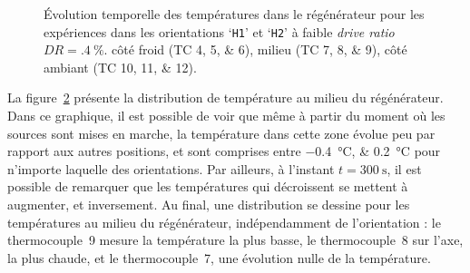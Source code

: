 \begin{figure}[!ht]
    \centering
	\begin{subfigure}{\textwidth}
		\centering
        
		\caption{}
		\label{fig:Acou_CHXin_H1H2_Low}
	\end{subfigure}		
	\begin{subfigure}{\textwidth}
		\centering
        
		\caption{}
		\label{fig:Acou_Regmid_H1H2_Low}
	\end{subfigure}
	\begin{subfigure}{\textwidth}
		\centering
        
		\caption{}
		\label{fig:Acou_AHXin_H1H2_Low}
	\end{subfigure}	
    \caption{\'Evolution temporelle des températures dans le régénérateur pour les expériences dans les orientations `\texttt{H1}' et `\texttt{H2}' à faible \textit{drive ratio} $DR=\qty{.4}{\percent}$.  côté froid (TC \numlist{4;5;6}),  milieu (TC \numlist{7;8;9}),  côté ambiant (TC \numlist{10;11;12}).} 
    \label{fig:Acou_H1H2_Low}
\end{figure}

%    

La figure~\ref{fig:Acou_Regmid_H1H2_Low} présente la distribution de température au milieu du régénérateur. Dans ce graphique, il est possible de voir que même à partir du moment où les sources sont mises en marche, la température dans cette zone évolue peu par rapport aux autres positions, et sont comprises entre \qtylist{-.4;.2}{\degreeCelsius} pour n'importe laquelle des orientations. Par ailleurs, à l'instant $t=\qty{300}{\second}$, il est possible de remarquer que les températures qui décroissent se mettent à augmenter, et inversement. Au final, une distribution se dessine pour les températures au milieu du régénérateur,  indépendamment de l'orientation : le thermocouple~9 mesure la température la plus basse, le thermocouple~8 sur l'axe, la plus chaude, et le thermocouple~7, une évolution nulle de la température. 

